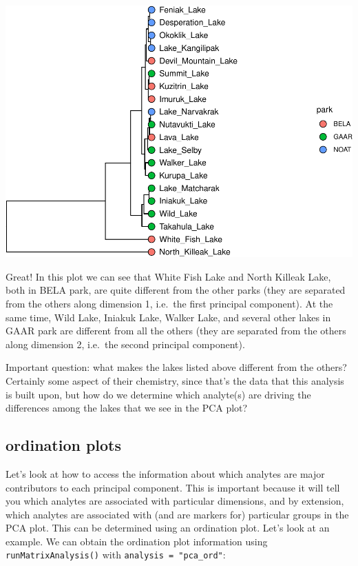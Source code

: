 \documentclass[
]{krantz}
\begin{document}
\begin{center}\includegraphics{index_files/figure-latex/unnamed-chunk-95-1} \end{center}

Great! In this plot we can see that White Fish Lake and North Killeak Lake, both in BELA park, are quite different from the other parks (they are separated from the others along dimension 1, i.e.~the first principal component). At the same time, Wild Lake, Iniakuk Lake, Walker Lake, and several other lakes in GAAR park are different from all the others (they are separated from the others along dimension 2, i.e.~the second principal component).

Important question: what makes the lakes listed above different from the others? Certainly some aspect of their chemistry, since that's the data that this analysis is built upon, but how do we determine which analyte(s) are driving the differences among the lakes that we see in the PCA plot?

\hypertarget{ordination-plots}{%
\subsection{ordination plots}\label{ordination-plots}}

Let's look at how to access the information about which analytes are major contributors to each principal component. This is important because it will tell you which analytes are associated with particular dimensions, and by extension, which analytes are associated with (and are markers for) particular groups in the PCA plot. This can be determined using an ordination plot. Let's look at an example. We can obtain the ordination plot information using \texttt{runMatrixAnalysis()} with \texttt{analysis\ =\ "pca\_ord"}:
\end{document}
